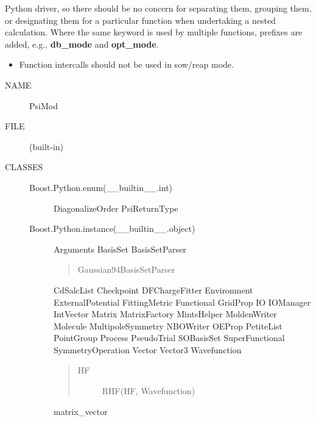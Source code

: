 \documentclass[letterpaper,10pt,english]{sphinxmanual}
\begin{document}
Python driver, so there should be no concern for separating them, grouping
them, or designating them for a particular function when undertaking a
nested calculation. Where the same keyword is used by multiple functions,
prefixes are added, e.g., \textbf{db\_mode} and \textbf{opt\_mode}.
\begin{itemize}
\item {} 
Function intercalls should not be used in sow/reap mode.

\end{itemize}
\begin{description}
\item[{NAME}] \leavevmode
PsiMod

\item[{FILE}] \leavevmode
(built-in)

\item[{CLASSES}] \leavevmode\begin{description}
\item[{Boost.Python.enum(\_\_builtin\_\_.int)}] \leavevmode
DiagonalizeOrder
PsiReturnType

\item[{Boost.Python.instance(\_\_builtin\_\_.object)}] \leavevmode
Arguments
BasisSet
BasisSetParser
\begin{quote}

Gaussian94BasisSetParser
\end{quote}

CdSalcList
Checkpoint
DFChargeFitter
Environment
ExternalPotential
FittingMetric
Functional
GridProp
IO
IOManager
IntVector
Matrix
MatrixFactory
MintsHelper
MoldenWriter
Molecule
MultipoleSymmetry
NBOWriter
OEProp
PetiteList
PointGroup
Process
PseudoTrial
SOBasisSet
SuperFunctional
SymmetryOperation
Vector
Vector3
Wavefunction
\begin{quote}
\begin{description}
\item[{HF}] \leavevmode
RHF(HF, Wavefunction)

\end{description}
\end{quote}

matrix\_vector


\end{description}
\end{description}
\end{document}
